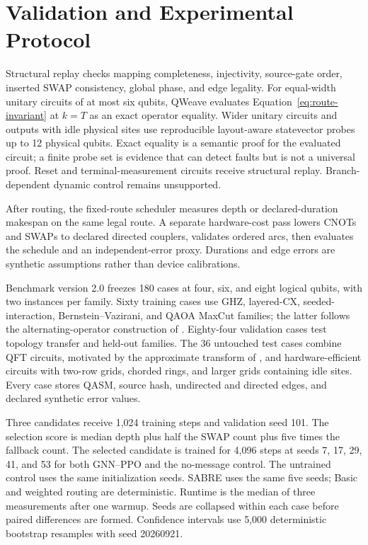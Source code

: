 \documentclass[a4paper,11pt,twocolumn]{article}
\begin{document}
\section{Validation and Experimental Protocol}
Structural replay checks mapping completeness, injectivity, source-gate order,
inserted SWAP consistency, global phase, and edge legality. For equal-width
unitary circuits of at most six qubits, QWeave evaluates
Equation~\eqref{eq:route-invariant} at $k=T$ as an exact operator equality.
Wider unitary circuits and outputs with idle physical sites use reproducible
layout-aware statevector probes up to 12 physical qubits. Exact equality is a
semantic proof for the evaluated circuit; a finite probe set is evidence that
can detect faults but is not a universal proof. Reset and terminal-measurement
circuits receive structural replay. Branch-dependent dynamic control remains
unsupported.

After routing, the fixed-route scheduler measures depth or declared-duration
makespan on the same legal route. A separate hardware-cost pass lowers CNOTs
and SWAPs to declared directed couplers, validates ordered arcs, then evaluates
the schedule and an independent-error proxy. Durations and edge errors are
synthetic assumptions rather than device calibrations.

Benchmark version 2.0 freezes 180 cases at four, six, and eight logical
qubits, with two instances per family. Sixty training cases use GHZ,
layered-CX, seeded-interaction, Bernstein--Vazirani, and QAOA MaxCut families;
the latter follows the alternating-operator construction of
\citet{farhi2014qaoa}. Eighty-four validation cases test topology transfer and
held-out families. The 36 untouched test cases combine QFT circuits, motivated
by the approximate transform of \citet{coppersmith2002qft}, and
hardware-efficient circuits with two-row grids, chorded rings, and larger
grids containing idle sites. Every case stores QASM, source hash, undirected
and directed edges, and declared synthetic error values.

Three candidates receive 1,024 training steps and validation seed 101. The
selection score is median depth plus half the SWAP count plus five times the
fallback count. The selected candidate is trained for 4,096 steps at seeds 7,
17, 29, 41, and 53 for both GNN--PPO and the no-message control. The untrained
control uses the same initialization seeds. SABRE uses the same five seeds;
Basic and weighted routing are deterministic. Runtime is the median of three
measurements after one warmup. Seeds are collapsed within each case before
paired differences are formed. Confidence intervals use 5,000 deterministic
bootstrap resamples with seed 20260921.
\end{document}

